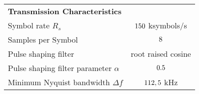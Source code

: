 \begin{table}[htbp]
\begin{tabular}{lc}
    \rowcolor[rgb]{ 0,  0,  0} \textcolor[rgb]{ 1,  1,  1}{\textbf{Transmission Characteristics}} & \textcolor[rgb]{ 1,  1,  1}{} 		\\
    	Symbol rate $R_s$ 						& $150$ ksymbols/s 				\\
    	Samples per Symbol 					& $8$													\\
	Pulse shaping filter 						& root raised cosine 											\\
    	Pulse shaping filter parameter $\alpha$ 		& $0.5$											\\
    	Minimum Nyquist bandwidth $\Delta f$ 		& $112,5$ kHz 							\\
    \end{tabular}
  \label{tab:specs_data}
\end{table}

